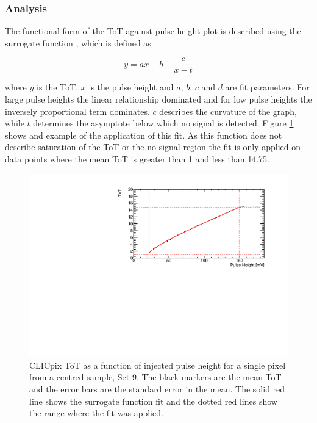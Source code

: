 
\subsubsection{Analysis}

The functional form of the ToT against pulse height plot is described using the surrogate function \cite{AlipourTehrani:2054922}, which is defined as

\begin{equation}
y  = ax + b  - \frac{c}{x-t}
\end{equation}

where $y$ is the ToT, $x$ is the pulse height and $a$, $b$, $c$ and $d$ are fit parameters.  For large pulse heights the linear relationship dominated and for low pulse heights the inversely proportional term dominates.  $c$ describes the curvature of the graph, while $t$ determines the asymptote below which no signal is detected.  Figure \ref{fig:testpulseexamplefit} shows and example of the application of this fit.  As this function does not describe saturation of the ToT or the no signal region the fit is only applied on data points where the mean ToT is greater than 1 and less than 14.75.  

\begin{figure}
\centering
\includegraphics[width=1.0\textwidth]{CLICdpVertex/Plots/TestPulseCalibration/Fits/Set9/ToT_PulseHeight_Set_9_ChipID_001ec0db94b1_Pixel_x0_y0_Fit.pdf}
\caption[CLICpix ToT as a function of injected pulse height.]{CLICpix ToT as a function of injected pulse height for a single pixel from a centred sample, Set 9.  The black markers are the mean ToT and the error bars are the standard error in the mean.  The solid red line shows the surrogate function fit and the dotted red lines show the range where the fit was applied.}
\label{fig:testpulseexamplefit}
\end{figure}

